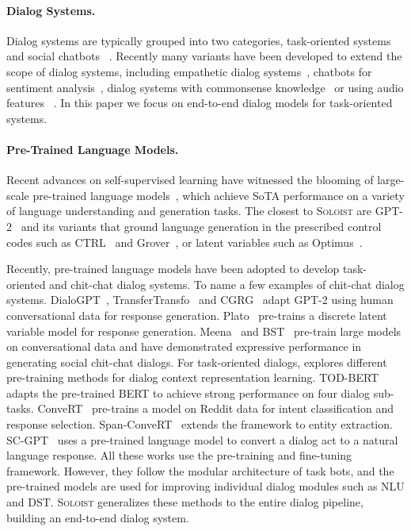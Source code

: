 \documentclass[11pt,a4paper]{article}
\newcommand{\eg}[0]{\emph{e.g., }}
\newcommand{\model}{\textsc{Soloist}}
\begin{document}
\paragraph{Dialog Systems.}
Dialog systems are typically grouped into two categories, task-oriented systems and social chatbots  ~\citep[\eg][]{chen2017survey,gao2019neural,DBLP:journals/corr/abs-2006-12442,DBLP:journals/coling/ZhouGLS20}.
Recently many variants have been developed to extend the scope of dialog systems, including empathetic dialog systems~\cite{ma2020survey, DBLP:conf/aaai/ZhouHZZL18}, chatbots for sentiment analysis~\cite{li2020bieru}, dialog systems with commonsense knowledge~\cite{young2018augmenting, DBLP:conf/acl/ShusterJRDBW20} or using audio features ~\cite{young2020dialogue}.
In this paper we focus on end-to-end dialog models for task-oriented systems.

\paragraph{Pre-Trained Language Models.}
Recent advances on self-supervised learning have witnessed the blooming of large-scale pre-trained language models~\cite[\eg][]{devlin2019bert,gpt2,dong2019unified}, which achieve SoTA performance on a variety of language understanding and generation tasks. The closest to \model{} are GPT-2~\cite{gpt2} and its variants that ground language generation in the prescribed control codes such as CTRL~\cite{keskar2019ctrl} and Grover~\cite{zellers2019defending}, or latent variables such as Optimus~\cite{li2020optimus}.

Recently, pre-trained language models have been adopted to develop task-oriented and chit-chat dialog systems. 
To name a few examples of chit-chat dialog systems. 
DialoGPT~\cite{zhang2019dialogpt}, TransferTransfo~\cite{wolf2019transfertransfo}
and CGRG~\cite{wu2020Controllable} adapt GPT-2 using human conversational data for response generation. Plato~\cite{bao2019plato} pre-trains a discrete latent variable model for response generation. Meena~\cite{adiwardana2020towards} and BST~\cite{roller2020recipes} pre-train large models on conversational data and have demonstrated expressive performance in generating social chit-chat dialogs. 
For task-oriented dialogs, \citet{mehri2019pretraining} explores different  pre-training methods for dialog context representation learning. TOD-BERT~\cite{Wu2020ToDBERTPN} adapts the pre-trained BERT to achieve strong performance on four dialog sub-tasks. 
ConveRT~\cite{DBLP:conf/emnlp/HendersonCMSWV20} pre-trains a model on Reddit data for intent classification and response selection. 
Span-ConveRT~\cite{DBLP:conf/acl/CoopeFGVH20} extends the framework to entity extraction. 
SC-GPT~\cite{peng2020few} uses a pre-trained language model to convert a dialog act to a natural language response. 
All these works use the pre-training and fine-tuning framework. However, they follow the modular architecture of task bots, and the pre-trained models are used for improving individual dialog modules such as NLU and DST. \model{} generalizes these methods to the entire dialog pipeline, building an end-to-end dialog system. 
\end{document}
